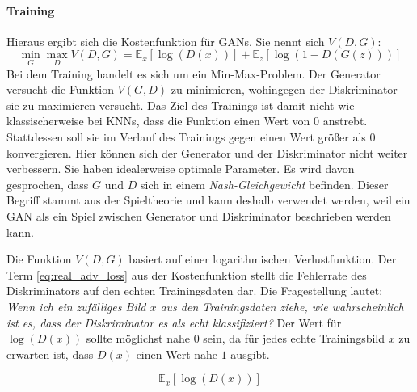 \paragraph{Training}
Hieraus ergibt sich die Kostenfunktion für \acp{GAN}. Sie nennt sich $V(D,G)$: \cite{Goodfellow-GANs}
\begin{equation}
   \label{eq:adv_loss}
	\min_{G} \max_{D} V(D,G) = \mathbb{E}_{x}[\log(D(x))] + \mathbb{E}_{z}[\log(1-D(G(z)))]
\end{equation}
Bei dem Training handelt es sich um ein Min-Max-Problem. Der Generator versucht die Funktion $V(G,D)$ zu minimieren, wohingegen der Diskriminator sie zu maximieren versucht. Das Ziel des Trainings ist damit nicht wie klassischerweise bei \acp{KNN}, dass die Funktion einen Wert von $0$ anstrebt. Stattdessen soll sie im Verlauf des Trainings gegen einen Wert größer als $0$ konvergieren. Hier können sich der Generator und der Diskriminator nicht weiter verbessern. Sie haben idealerweise optimale Parameter. Es wird davon gesprochen, dass $G$ und $D$ sich in einem \emph{Nash-Gleichgewicht} befinden. Dieser Begriff stammt aus der Spieltheorie und kann deshalb verwendet werden, weil ein \ac{GAN} als ein Spiel zwischen Generator und Diskriminator beschrieben werden kann. \cite{GANs}

Die Funktion $V(D,G)$ basiert auf einer logarithmischen Verlustfunktion. Der Term \ref{eq:real_adv_loss} aus der Kostenfunktion stellt die Fehlerrate des Diskriminators auf den echten Trainingsdaten dar. Die Fragestellung lautet: \emph{Wenn ich ein zufälliges Bild $x$ aus den Trainingsdaten ziehe, wie wahrscheinlich ist es, dass der Diskriminator es als echt klassifiziert?} Der Wert für $\log(D(x))$ sollte möglichst nahe $0$ sein, da für jedes echte Trainingsbild $x$ zu erwarten ist, dass $D(x)$ einen Wert nahe $1$ ausgibt.

\begin{equation}
	\label{eq:real_adv_loss}
	\mathbb{E}_{x}[\log(D(x))]
\end{equation}

